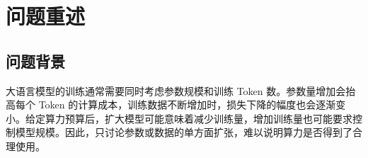 \documentclass[bwprint]{gmcmthesis}
\begin{document}
\begin{abstract}
    \textbf{针对问题三：}参数扩张、数据增量、质量治理和长上下文共同消耗算力，单独优化其中一项可能偏离有限预算下的最佳配置。本文以前两问辨识的逐目标损失响应构造\textbf{等权优化目标}，把配比约束在 512 组真实训练配方的凸包内，联合求解参数量、Token 数、治理质量和来源份额。成本函数同时计入基础训练、增量质量治理与外生上下文对应的注意力开销，并通过\textbf{多起点约束求解}、\textbf{四组消融}、\textbf{成本情景对照}和\textbf{有限候选最大后悔值}检验配置的稳定性。在 11 档预算、5 档上下文和 3 种质量成本函数构成的 165 个情景中，联合配置相对同预算规模基线的平均预测损失降低 $4.16\%$--$5.81\%$。进一步扩大真实配方搜索范围后，在上下文长度为 4096 的 33 个情景中，预测损失在原联合解基础上再降低 $0.84\%$--$2.55\%$，说明来源配比的可行空间会实质影响优化结果。有限候选的最大相对后悔值为 $1.55\%$，支持所考察质量收益情景下配置的稳定性。注意力成本与基础训练成本相当的临界上下文长度为 $30000$，为\textbf{长上下文需求下的预算分配提供了明确参照}。

    \textbf{针对问题四：}前三问得到的验证损失不能直接与现实模型的综合评测得分比较，单纯拟合两条时间趋势也无法分离算力扩张与其他技术变化。本文以六项任务的等权得分和三个月滚动高分位定义\textbf{开放权重模型的能力前沿}，利用来源校准的\textbf{单调 Loss--Benchmark 桥接}连接最优损失与能力尺度，再将历史增长分解为\textbf{规模机制项}和\textbf{非规模综合残差}。对于超出共同观测支持域的部分，以饱和和末端斜率延续构造贡献的部分识别集合，并在同一状态方程下推演算力平台情景，使用\textbf{滚动起点回测检查短期预测}。观测期能力前沿提高 $8.307$ 分，固定样本下规模贡献份额仅能限定在 $0\%$--$8.52\%$，表明非规模综合因素在该识别集合中承担主要增长。算力平台情景的 12 个月点预测为 $53.358$ 分，预测区间主要受未来非规模状态影响，且短期点预测误差未低于简单保持基线，因此该模型\textbf{能够提供有边界的结构反事实分析}。

\end{abstract}

\pagestyle{plain}
\maketoc
\clearpage

\section{问题重述}
\subsection{问题背景}

大语言模型的训练通常需要同时考虑参数规模和训练 Token 数。参数量增加会抬高每个 Token 的计算成本，训练数据不断增加时，损失下降的幅度也会逐渐变小。给定算力预算后，扩大模型可能意味着减少训练量，增加训练量也可能要求控制模型规模。因此，只讨论参数或数据的单方面扩张，难以说明算力是否得到了合理使用。
\end{document}
